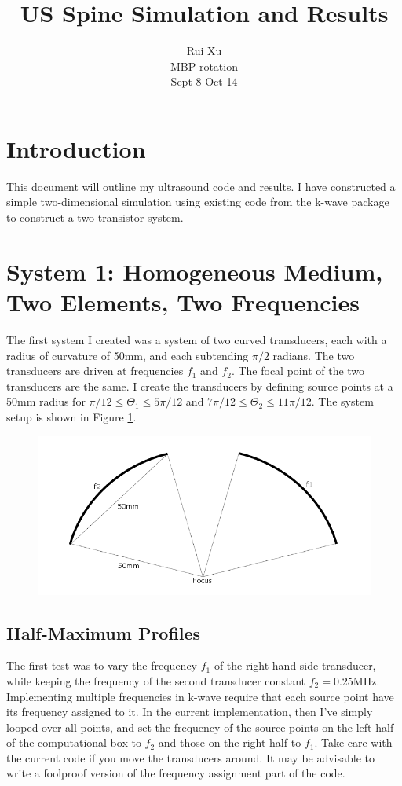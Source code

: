 \documentclass[10pt,a4paper]{article}
\title{US Spine Simulation and Results}
\author{Rui Xu \\ MBP rotation\\ Sept 8-Oct 14}
\begin{document}
\maketitle
 \newpage

\section{Introduction}

This document will outline my ultrasound code and results. I have constructed a simple two-dimensional simulation using existing code from the k-wave package to construct a two-transistor system.

\section{System 1: Homogeneous Medium, Two Elements, Two Frequencies}

The first system I created was a system of two curved transducers, each with a radius of curvature of 50mm, and each subtending $\pi/2$ radians. The two transducers are driven at frequencies $f_1$ and $f_2$. The focal point of the two transducers are the same. I create the transducers by defining source points at a 50mm radius for $\pi/12 \leq \Theta_1 \leq 5\pi/12$ and $7\pi/12 \leq \Theta_2 \leq 11 \pi/12$. The system setup is shown in Figure \ref{setup1}.

\begin{figure}[!h]\label{setup1}
\centering
\includegraphics[scale=0.5]{setup1.png}
\centering
\end{figure}

\subsection{Half-Maximum Profiles}

The first test was to vary the frequency $f_1$ of the right hand side transducer, while keeping the frequency of the second transducer constant $f_2 = 0.25$MHz. Implementing multiple frequencies in k-wave require that each source point have its frequency assigned to it. In the current implementation, then I've simply looped over all points, and set the frequency of the source points on the left half of the computational box to $f_2$ and those on the right half to $f_1$. Take care with the current code if you move the transducers around. It may be advisable to write a foolproof version of the frequency assignment part of the code.\\
\end{document}
